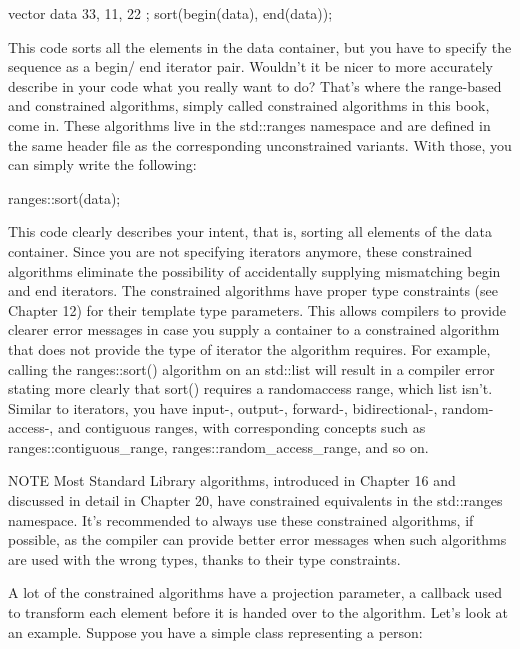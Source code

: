 \begin{cpp}
vector data { 33, 11, 22 };
sort(begin(data), end(data));
\end{cpp}

This code sorts all the elements in the data container, but you have to specify the sequence as a begin/ end iterator pair. Wouldn’t it be nicer to more accurately describe in your code what you really want to do? That’s where the range-based and constrained algorithms, simply called constrained algorithms in this book, come in. These algorithms live in the std::ranges namespace and are defined in the same header file as the corresponding unconstrained variants. With those, you can simply write the following:

\begin{cpp}
ranges::sort(data);
\end{cpp}

This code clearly describes your intent, that is, sorting all elements of the data container. Since you are not specifying iterators anymore, these constrained algorithms eliminate the possibility of accidentally supplying mismatching begin and end iterators. The constrained algorithms have proper type constraints (see Chapter 12) for their template type parameters. This allows compilers to provide clearer error messages in case you supply a container to a constrained algorithm that does not provide the type of iterator the algorithm requires. For example, calling the ranges::sort() algorithm on an std::list will result in a compiler error stating more clearly that sort() requires a randomaccess range, which list isn’t. Similar to iterators, you have input-, output-, forward-, bidirectional-, random-access-, and contiguous ranges, with corresponding concepts such as ranges::contiguous\_range, ranges::random\_access\_range, and so on.

\begin{myNotic}{NOTE}
Most Standard Library algorithms, introduced in Chapter 16 and discussed in detail in Chapter 20, have constrained equivalents in the std::ranges namespace. It’s recommended to always use these constrained algorithms, if possible, as the compiler can provide better error messages when such algorithms are used with the wrong types, thanks to their type constraints.
\end{myNotic}


A lot of the constrained algorithms have a projection parameter, a callback used to transform each element before it is handed over to the algorithm. Let’s look at an example. Suppose you have a simple class representing a person:

